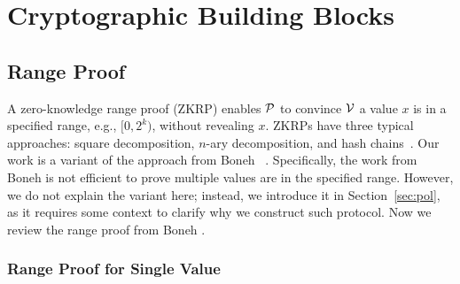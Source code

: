 \chapter{Cryptographic Building Blocks}

\section{Range Proof}
\label{sec:range}

A zero-knowledge range proof (ZKRP) enables $\mathcal{P}$ to convince $\mathcal{V}$ a value $x$ is in a specified range, e.g., $[0,2^k)$, without revealing $x$. ZKRPs have three typical approaches: square decomposition, $n$-ary decomposition, and hash chains~\cite{zkrp}. Our work is a variant of the approach from Boneh \etal~\cite{rangeproof}. Specifically, the work from Boneh \etal is not efficient to prove multiple values are in the specified range. However, we do not explain the variant here; instead, we introduce it in Section~\ref{sec:pol}, as it requires some context to clarify why we construct such protocol. Now we review the range proof from Boneh \etal.

\subsection{Range Proof for Single Value}
\label{sec:range}

